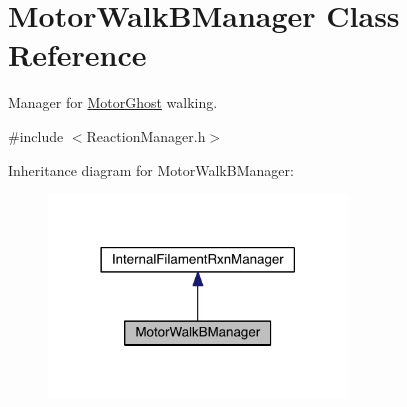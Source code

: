 \hypertarget{classMotorWalkBManager}{\section{Motor\+Walk\+B\+Manager Class Reference}
\label{classMotorWalkBManager}
}


Manager for \hyperlink{classMotorGhost}{Motor\+Ghost} walking.  




{\ttfamily \#include $<$Reaction\+Manager.\+h$>$}



Inheritance diagram for Motor\+Walk\+B\+Manager\+:\nopagebreak
\begin{figure}[H]
\begin{center}
\leavevmode
\includegraphics[width=225pt]{classMotorWalkBManager__inherit__graph}
\end{center}
\end{figure}


